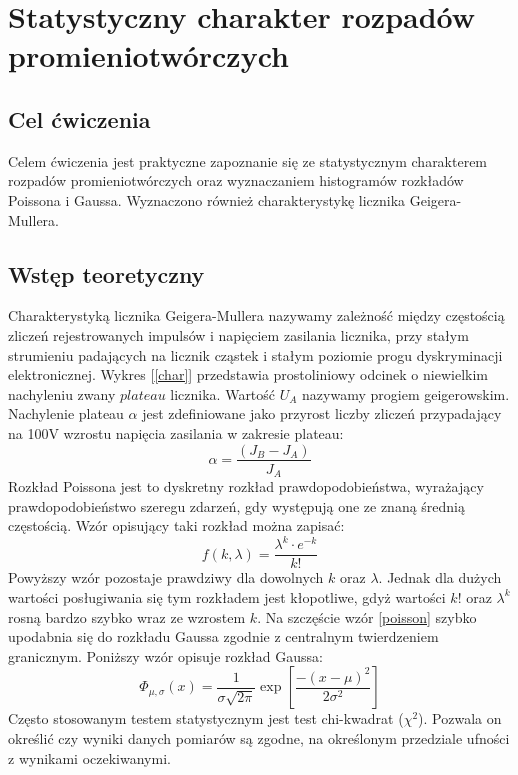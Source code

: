 \documentclass{article}
\begin{document}
\section{Statystyczny charakter rozpadów promieniotwórczych}
\subsection{Cel ćwiczenia}
Celem ćwiczenia jest praktyczne zapoznanie się ze statystycznym charakterem rozpadów promieniotwórczych oraz wyznaczaniem histogramów rozkładów Poissona i Gaussa. Wyznaczono również charakterystykę licznika Geigera-Mullera.
\subsection{Wstęp teoretyczny}
Charakterystyką licznika Geigera-Mullera nazywamy zależność między częstością zliczeń rejestrowanych impulsów i napięciem zasilania licznika, przy stałym strumieniu padających na licznik cząstek i stałym poziomie progu dyskryminacji elektronicznej. Wykres [\ref{char}] przedstawia prostoliniowy odcinek o niewielkim nachyleniu zwany $plateau$ licznika. Wartość $U_A$ nazywamy progiem geigerowskim. Nachylenie plateau $\alpha$ jest zdefiniowane jako przyrost liczby zliczeń przypadający na 100V wzrostu napięcia zasilania w zakresie plateau:
\begin{equation}
\label{nachylenie}
	 \alpha = \frac{(J_B - J_A)}{J_A}
\end{equation}
Rozkład Poissona jest to dyskretny rozkład prawdopodobieństwa, wyrażający prawdopodobieństwo szeregu zdarzeń, gdy występują one ze znaną średnią częstością. Wzór opisujący taki rozkład można zapisać:
\begin{equation}
\label{poisson}
	f(k,\lambda) = \frac{\lambda^k \cdot e^{-k}}{k!}
\end{equation}
Powyższy wzór pozostaje prawdziwy dla dowolnych $k$ oraz $\lambda$. Jednak dla dużych wartości posługiwania się tym rozkładem jest kłopotliwe, gdyż wartości $k!$ oraz $\lambda^k$ rosną bardzo szybko wraz ze wzrostem $k$. Na szczęście wzór \ref{poisson} szybko upodabnia się do rozkładu Gaussa zgodnie z centralnym twierdzeniem granicznym. Poniższy wzór opisuje rozkład Gaussa:
\begin{equation}
	\label{gauss}
	\Phi_{\mu,\sigma}(x) = \frac{1}{\sigma\sqrt{2\pi}}\exp{\left[\frac{-(x-\mu)^2}{2\sigma^2} \right]}
\end{equation}
Często stosowanym testem statystycznym jest test chi-kwadrat ($\chi^2$). Pozwala on określić czy wyniki danych pomiarów są zgodne, na określonym przedziale ufności z wynikami oczekiwanymi.
\end{document}
